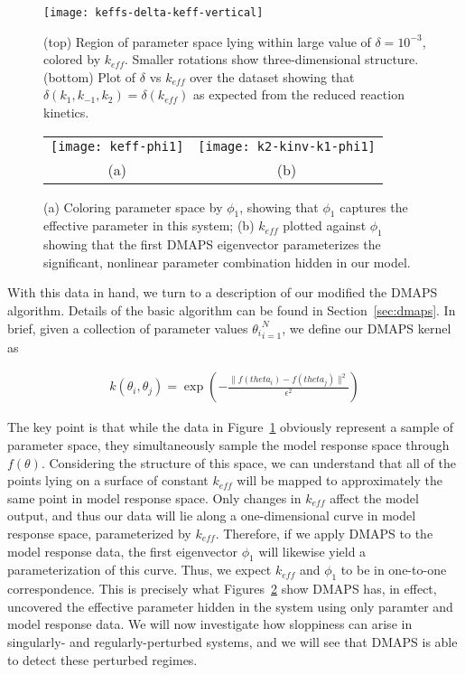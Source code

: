\begin{figure}[ht!]
  \centering
  \texttt{[image: keffs-delta-keff-vertical]}
  \caption[Quantitative three-dimensional views of level sets of the
  effective parameter in a model of chemical kinetics]{(top) Region of
    parameter space lying within large value of $\delta = 10^{-3}$,
    colored by $k_{eff}$. Smaller rotations show three-dimensional
    structure. (bottom) Plot of $\delta$ vs $k_{eff}$ over the dataset
    showing that $\delta(k_1, k_{-1}, k_2) = \delta(k_{eff})$ as
    expected from the reduced reaction kinetics. \label{fig:abc-keff}}
\end{figure}


\begin{figure}[!htp]
\centering
\begin{tabular}{cc}
  \texttt{[image: keff-phi1]} &
  \texttt{[image: k2-kinv-k1-phi1]}\\
  (a) & (b)
\end{tabular}
\caption{(a) Coloring parameter space by $\phi_1$, showing that
  $\phi_1$ captures the effective parameter in this system; (b)
  $k_{eff}$ plotted against $\phi_1$ showing that the first DMAPS
  eigenvector parameterizes the significant, nonlinear parameter
  combination hidden in our model. \label{fig:abc-dmaps}} 
\end{figure}


With this data in hand, we turn to a description of our modified the
DMAPS algorithm. Details of the basic algorithm can be found in
Section~\ref{sec:dmaps}. In brief, given a collection of parameter
values ${\theta_i}_{i=1}^N$, we define our DMAPS kernel as

\begin{align}
  k(\theta_i, \theta_j) = \exp \left(-\frac{\|f(theta_i) -
  f(theta_j)\|^2}{\epsilon^2} \right)
  \label{eq:dmaps-mm}
\end{align}

The key point is that while the data in Figure~\ref{fig:abc-keff}
obviously represent a sample of parameter space, they simultaneously
sample the model response space through $f(\theta)$. Considering the
structure of this space, we can understand that all of the points
lying on a surface of constant $k_{eff}$ will be mapped to
approximately the same point in model response space. Only changes in
$k_{eff}$ affect the model output, and thus our data will lie along a
one-dimensional curve in model response space, parameterized by
$k_{eff}$. Therefore, if we apply DMAPS to the model response data,
the first eigenvector $\phi_1$ will likewise yield a parameterization
of this curve. Thus, we expect $k_{eff}$ and $\phi_1$ to be in
one-to-one correspondence. This is precisely what
Figures~\ref{fig:abc-dmaps} show DMAPS has, in effect, uncovered the
effective parameter hidden in the system using only paramter and model
response data. We will now investigate how sloppiness can arise in
singularly- and regularly-perturbed systems, and we will see that
DMAPS is able to detect these perturbed regimes.


